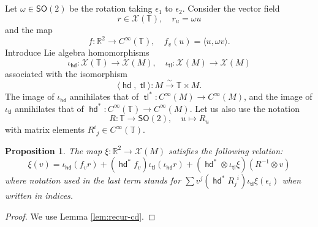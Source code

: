 \documentclass{amsart}
\def\RR{\mathbb{R}}
\def\TT{\mathbb{T}}
\def\XX{\mathscr{X}}
\def\SO{\mathsf{SO}}
\DeclareMathOperator{\tail}{{\mathsf{tl}}}
\DeclareMathOperator{\head}{{\mathsf{hd}}}
\newtheorem{prop}{Proposition}
\theoremstyle{definition}
\begin{document}
\subsection{}Let $\omega \in \SO(2)$ be the rotation taking $\epsilon_1$ to $\epsilon_2$.
Consider the vector field 
$$ r \in \XX(\TT),\quad r_u = \omega u $$
and the map
$$ f : \RR^2 \to C^\infty(\TT),\quad f_v(u)= \langle u, \omega v\rangle.$$
Introduce Lie algebra homomorphisms 
$$
\iota_{\head} : \XX(\TT) \to \XX(M),\quad \iota_{\tail} : \XX(M) \to \XX(M)
$$
associated with the isomorphism
$$ \langle \head,\tail \rangle : M \xrightarrow{\sim} \TT \times M. $$
The image of $\iota_{\head}$ annihilates that of $\tail^* :C^\infty(M) \to C^\infty(M)$,
and the image of $\iota_{\tail}$ annihilates that of $\head^* : C^\infty(\TT) \to C^\infty(M)$.
Let us also use the notation
$$ R : \TT \to \SO(2),\quad u\mapsto R_u $$
with matrix elements ${R^i}_{j} \in C^\infty(\TT)$.
\begin{prop}
The map $\xi : \RR^2 \to \XX(M)$ satisfies the following relation:
$$
\xi(v) = \iota_{\head} (f_v r) + (\head^* f_v) \iota_{\tail} (\iota_{\head} r)
+ (\head^* \otimes \iota_{\tail}\xi) (R^{-1}\otimes v)
 $$
 where notation used in the last term stands for
$\sum v^j (\head^*{R_j}^i) \iota_{\tail} \xi(\epsilon_i)$
when written in indices.
\end{prop}
\begin{proof}
        We use Lemma \ref{lem:recur-cd}.
\end{proof}
\end{document}
